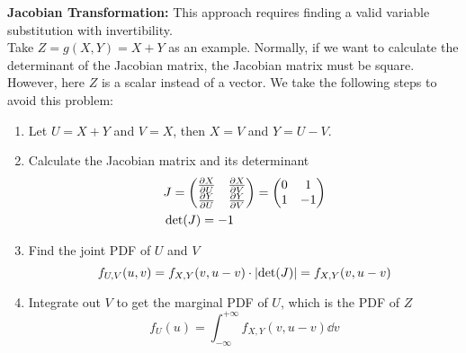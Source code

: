 \begin{solution}
    \textbf{Jacobian Transformation:} This approach requires finding a valid variable substitution with invertibility. \\ 
    Take $Z = g(X, Y) = X + Y$ as an example. Normally, if we want to calculate the determinant of the Jacobian matrix, the Jacobian matrix must be square. However, here $Z$ is a scalar instead of a vector. We take the following steps to avoid this problem:
    \begin{enumerate}
        \item Let $U = X + Y$ and $V = X$, then $X = V$ and $Y = U - V$.
        \item Calculate the Jacobian matrix and its determinant
            \begin{align}
                &J = \mqty(\pdv{X}{U} & \pdv{X}{V} \\ \pdv{Y}{U} & \pdv{Y}{V}) = \mqty(0 & 1 \\ 1 & -1) \\ 
                &\det(J) = -1 
            \end{align}
        \item Find the joint PDF of $U$ and $V$
            \begin{equation}
                f_{U, V}(u, v) = f_{X, Y}(v, u - v) \cdot \abs{\det(J)} = f_{X, Y}(v, u - v)
            \end{equation}
        \item Integrate out $V$ to get the marginal PDF of $U$, which is the PDF of $Z$
            \begin{equation}
                f_{U}(u) = \int_{-\infty}^{+\infty} f_{X, Y}(v, u - v) \dd{v}
            \end{equation}
    \end{enumerate}
\end{solution}
